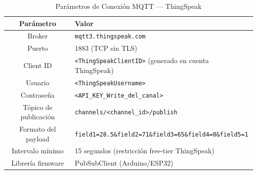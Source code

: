 \begin{table}[tp]
\centering
\renewcommand{\arraystretch}{1.3}
\caption{Parámetros de Conexión MQTT --- ThingSpeak}
\label{tab:mqtt_params}
\begin{tabularx}{\textwidth}{|c|X|}
\hline
\textbf{Parámetro} & \textbf{Valor} \\
\hline
Broker & \texttt{mqtt3.thingspeak.com} \\
\hline
Puerto & 1883 (TCP sin TLS) \\
\hline
Client ID & \texttt{<ThingSpeakClientID>} (generado en cuenta ThingSpeak) \\
\hline
Usuario & \texttt{<ThingSpeakUsername>} \\
\hline
Contraseña & \texttt{<API\_KEY\_Write\_del\_canal>} \\
\hline
Tópico de publicación & \texttt{channels/<channel\_id>/publish} \\
\hline
Formato del payload & \texttt{field1=28.5\&field2=71\&field3=65\&field4=0\&field5=1} \\
\hline
Intervalo mínimo & 15 segundos (restricción free-tier ThingSpeak) \\
\hline
Librería firmware & PubSubClient (Arduino/ESP32) \\
\hline
\end{tabularx}
\end{table}